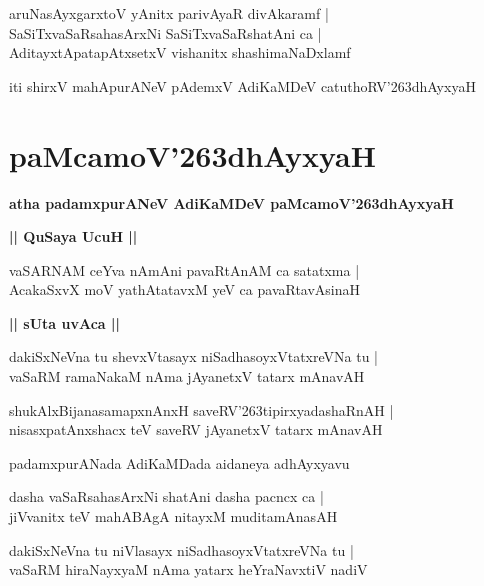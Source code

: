 \documentclass[twoside,12pt,openright]{book}
\def\S{\char'263}
\newcounter{shloka}[chapter]
\def\uvaca#1{\centerline{{\large\textbf{#1}}}}
\begin{document}
\begin{shloka}
aruNasAyxgarxtoV yAnitx parivAyaR divAkaramf |\\
SaSiTxvaSaRsahasArxNi SaSiTxvaSaRshatAni ca |\\
AditayxtApatapAtxsetxV vishanitx shashimaNaDxlamf
\end{shloka}

\begin{center}
iti shirxV mahApurANeV pAdemxV AdiKaMDeV catuthoRV\S dhAyxyaH
\end{center}

\chapter{paMcamoV\S dhAyxyaH}

\begin{center}
{\LARGE\bfseries atha padamxpurANeV AdiKaMDeV paMcamoV\S dhAyxyaH}
\end{center}

\uvaca{|| QuSaya UcuH ||}

\begin{shloka}
vaSARNAM ceYva nAmAni pavaRtAnAM ca satatxma |\\
AcakaSxvX moV yathAtatavxM yeV ca pavaRtavAsinaH
\end{shloka}

\uvaca{|| sUta uvAca ||}

\begin{shloka}
dakiSxNeVna tu shevxVtasayx niSadhasoyxVtatxreVNa tu |\\
vaSaRM ramaNakaM nAma jAyanetxV tatarx mAnavAH
\end{shloka}

\begin{shloka}
shukAlxBijanasamapxnAnxH saveRV\S tipirxyadashaRnAH |\\
nisasxpatAnxshacx teV saveRV jAyanetxV tatarx mAnavAH
\end{shloka}

\begin{center}
padamxpurANada AdiKaMDada aidaneya adhAyxyavu
\end{center}

\begin{shloka}
dasha vaSaRsahasArxNi shatAni dasha pacncx ca |\\
jiVvanitx teV mahABAgA nitayxM muditamAnasAH
\end{shloka}

\begin{shloka}
dakiSxNeVna tu niVlasayx niSadhasoyxVtatxreVNa tu |\\
vaSaRM hiraNayxyaM nAma yatarx heYraNavxtiV nadiV 
\end{shloka}
\end{document}

